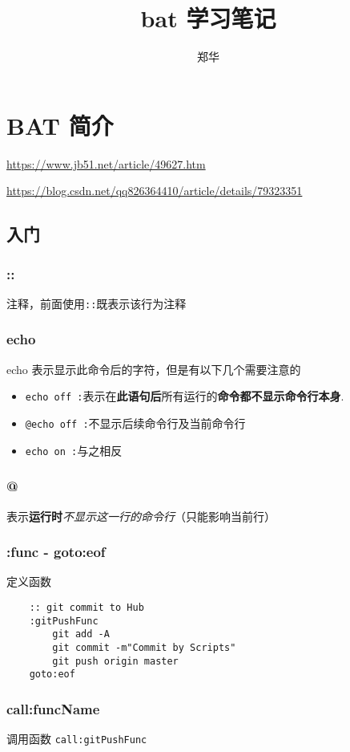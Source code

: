 \documentclass[UTF8,a4paper,12pt]{ctexbook}
\author{\kaishu 郑华}
\title{\heiti bat 学习笔记}
\begin{document}
 	\maketitle
 	\tableofcontents

\chapter{BAT 简介}	
	\url{https://www.jb51.net/article/49627.htm}
	
	\url{https://blog.csdn.net/qq826364410/article/details/79323351}
	
	\section{入门}
		\subsection{::} 注释，前面使用\verb|::|既表示该行为注释 
		
		\subsection{echo}echo 表示显示此命令后的字符，但是有以下几个需要注意的
			\begin{itemize}
				\item \verb|echo off :|表示在\textbf{此语句后}所有运行的\textbf{命令都不显示命令行本身}.
				\item \verb|@echo off :|不显示后续命令行及当前命令行
				\item \verb|echo on :|与之相反
			\end{itemize}
			
		\subsection{@}表示\textbf{运行时}\textit{不显示这一行的命令行}（只能影响当前行）
		
		\subsection{:func - goto:eof}定义函数
			\begin{lstlisting}
	:: git commit to Hub
	:gitPushFunc
		git add -A
		git commit -m"Commit by Scripts"
		git push origin master
	goto:eof
			\end{lstlisting}
		
		\subsection{call:funcName} 调用函数
			\verb|call:gitPushFunc|
		
\end{document}
